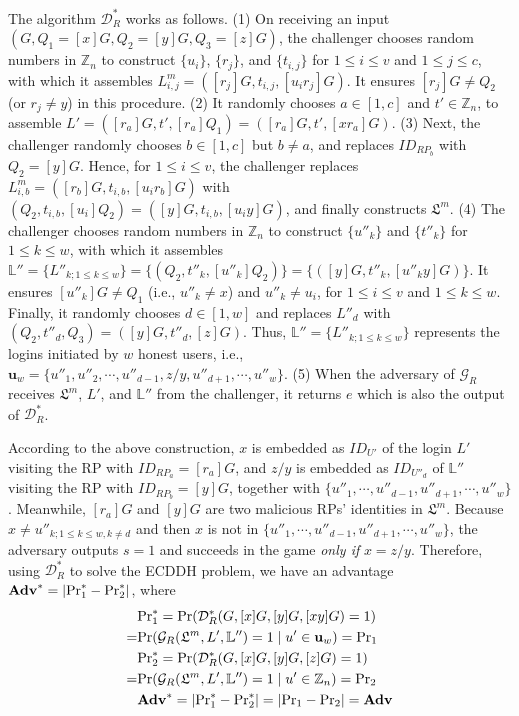 The algorithm $\mathcal{D}^*_R$ works as follows. (1) On receiving an input $(G, Q_1=[x]G, Q_2=[y]G, Q_3=[z]G)$,
the challenger
chooses random numbers in $\mathbb{Z}_n$ to construct $\{u_i\}$, $\{r_j\}$, and $\{t_{i, j}\}$ for $1 \le i \le v$ and $1 \le j \le c$, with which it assembles $L^m_{i, j}=([r_j]G, t_{i,j}, [u_ir_j]G)$.
It ensures $[r_{j}]G \neq Q_2$ (or $r_j \neq y$) in this procedure.
(2) It randomly chooses $a \in [1, c]$ and $t' \in \mathbb{Z}_n$, to assemble $L' = ([r_{a}]G, t', [r_{a}]Q_1) = ([r_{a}]G, t', [xr_{a}]G)$.
(3)
Next, the challenger randomly chooses $b \in [1, c]$ but $b \neq a$, and replaces $ID_{RP_b}$ with $Q_2 = [y]G$.
Hence, for $1 \le i \le v$, the challenger replaces $L^m_{i, b}=([r_b]G, t_{i,b}, [u_ir_b]G)$ with $(Q_2, t_{i,b}, [u_i]Q_2) = ([y]G, t_{i,b}, [u_iy]G)$, and finally constructs $\mathfrak{L}^m$.
(4) The challenger chooses random numbers in $\mathbb{Z}_n$ to construct $\{u''_k\}$ and $\{t''_k\}$ for $1 \leq k \leq w$,
 with which it assembles $\mathbb{L}'' = \{L''_{k; 1\leq k \leq w}\} = \{(Q_2, t''_k, [u''_k]Q_2)\} = \{([y]G, t''_k, [u''_ky]G)\}$.
It ensures $[u''_k]G \neq Q_1$ (i.e., $u''_k \neq x$) and $u''_k \neq u_i$,
 for $1 \le i \le v$ and $1 \le k \le w$.
Finally, it randomly chooses $d \in [1, w]$ and replaces $L''_{d}$ with $(Q_2, t''_d, Q_3) = ([y]G, t''_d, [z]G)$.
 Thus, $\mathbb{L}'' = \{L''_{k;1\leq k \leq w}\}$ represents the logins initiated by $w$ honest users, i.e., $\mathbf{u}_w=\{u''_1, u''_2, \cdots, u''_{d-1}, z/y, u''_{d+1}, \cdots, u''_w\}$.
 (5) When the adversary of $\mathcal{G}_R$ receives $\mathfrak{L}^m$, $L'$, and $\mathbb{L}''$ from the challenger, it returns $e$ which is also the output of $\mathcal{D}^*_R$.

According to the above construction, %
$x$ is embedded as $ID_{U'}$ of the login $L'$ visiting the RP with $ID_{RP_{a}} = [r_{a}]G$,
and $z/y$ is embedded as $ID_{U''_d}$ of $\mathbb{L}''$ visiting the RP with $ID_{RP_{b}}=[y]G$,
together with $\{u''_1, \cdots, u''_{d-1}, u''_{d+1}, \cdots, u''_w\}$.
Meanwhile, $[r_{a}]G$ and $[y]G$ are two malicious RPs' identities in $\mathfrak{L}^m$.
Because $x \neq u''_{k; 1\leq k \leq w, k \neq d}$ and then $x$ is not in $\{u''_1, \cdots, u''_{d-1}, u''_{d+1}, \cdots, u''_w\}$, the adversary outputs $s=1$ and succeeds in the game \emph{only if} $x = z/y$.
Therefore, using $\mathcal{D}^*_R$ to solve the ECDDH problem, we have an advantage $\mathbf{Adv}^*=|{\rm Pr}^*_1 - {\rm Pr}^*_2|$, where
\begin{align*}
&{\rm Pr}^*_1 =  {\rm Pr}(\mathcal{D}^*_R(G, [x]G, [y]G, [xy]G)=1) \\
=&{\rm Pr}(\mathcal{G}_R(\mathfrak{L}^m, L', \mathbb{L}'')=1 \; | \; u' \in \mathbf{u}_w) = {\rm Pr}_1 \\
&{\rm Pr}^*_2= {\rm Pr}(\mathcal{D}^*_R(G, [x]G, [y]G, [z]G)=1) \\
=&{\rm Pr}(\mathcal{G}_R(\mathfrak{L}^m, L', \mathbb{L}'')=1 \; | \; u' \in \mathbb{Z}_n) = {\rm Pr}_2 \\
&\mathbf{Adv}^*=|{\rm Pr}^*_1-{\rm Pr}^*_2|=|{\rm Pr}_1-{\rm Pr}_2|={\mathbf{Adv}}
\end{align*}

